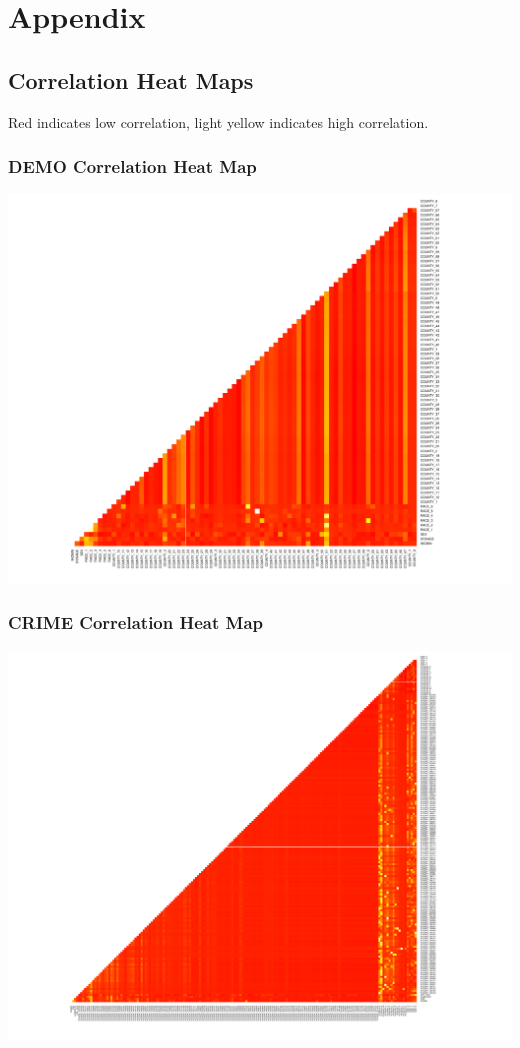 \documentclass[11pt,letter]{article}
\begin{document}
\section{Appendix}

\subsection{Correlation Heat Maps}
Red indicates low correlation, light yellow indicates high correlation.
\subsubsection{DEMO Correlation Heat Map}
\includegraphics[scale=0.5]{report_figures/demo.pdf}
\subsubsection{CRIME Correlation Heat Map}
\includegraphics[scale=0.5]{report_figures/crime.pdf}
\end{document}
